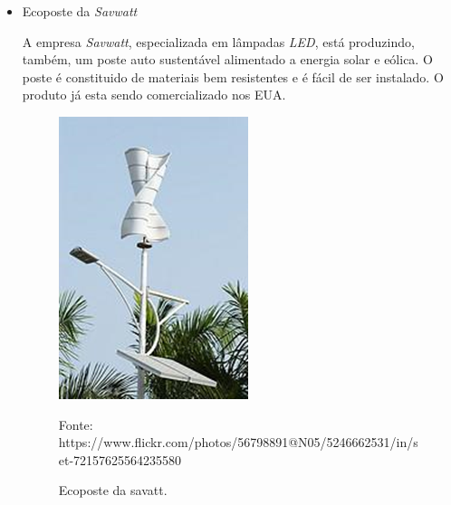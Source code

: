 \begin{itemize}
	\item Ecoposte da \textit{Savwatt}
	
	A empresa \textit{Savwatt}, especializada em lâmpadas \textit{LED}, está produzindo, também, um poste auto sustentável alimentado a energia solar e eólica. O poste é constituido de materiais bem resistentes e é fácil de ser instalado. O produto já esta sendo comercializado nos EUA.
	
	\begin{figure}[H]
	 \centering
	\label{Ecoposte da savatt}
	 \includegraphics[keepaspectratio=true,scale=0.8]{postes/2.png}
	 \caption{Ecoposte da savatt.}
	 \small{Fonte: https://www.flickr.com/photos/56798891@N05/5246662531/in/set-72157625564235580}
	\end{figure}

\end{itemize}
	
